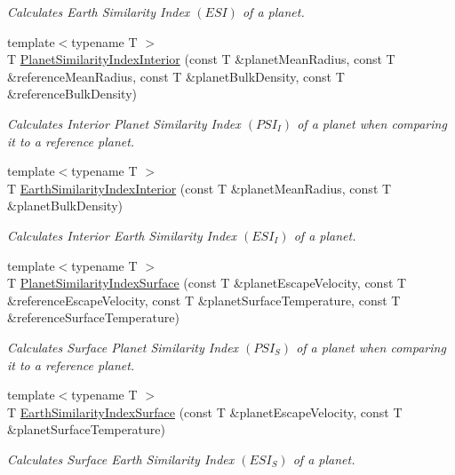 \begin{DoxyCompactItemize}
\begin{DoxyCompactList}\small\item\em Calculates Earth Similarity Index $(ESI)$ of a planet. \end{DoxyCompactList}\item 
{\footnotesize template$<$typename T $>$ }\\T \mbox{\hyperlink{group___e_g_x_phys-_planet_criteria_ga6dc06a1a8baf6e132abed51fcf410c7f}{Planet\+Similarity\+Index\+Interior}} (const T \&planet\+Mean\+Radius, const T \&reference\+Mean\+Radius, const T \&planet\+Bulk\+Density, const T \&reference\+Bulk\+Density)
\begin{DoxyCompactList}\small\item\em Calculates Interior Planet Similarity Index $(PSI_I)$ of a planet when comparing it to a reference planet. \end{DoxyCompactList}\item 
{\footnotesize template$<$typename T $>$ }\\T \mbox{\hyperlink{group___e_g_x_phys-_planet_criteria_ga699bcc2f17b8855eaa856595d8032f61}{Earth\+Similarity\+Index\+Interior}} (const T \&planet\+Mean\+Radius, const T \&planet\+Bulk\+Density)
\begin{DoxyCompactList}\small\item\em Calculates Interior Earth Similarity Index $(ESI_I)$ of a planet. \end{DoxyCompactList}\item 
{\footnotesize template$<$typename T $>$ }\\T \mbox{\hyperlink{group___e_g_x_phys-_planet_criteria_gae0c7dce2779d66b0560ca388a34ddc39}{Planet\+Similarity\+Index\+Surface}} (const T \&planet\+Escape\+Velocity, const T \&reference\+Escape\+Velocity, const T \&planet\+Surface\+Temperature, const T \&reference\+Surface\+Temperature)
\begin{DoxyCompactList}\small\item\em Calculates Surface Planet Similarity Index $(PSI_S)$ of a planet when comparing it to a reference planet. \end{DoxyCompactList}\item 
{\footnotesize template$<$typename T $>$ }\\T \mbox{\hyperlink{group___e_g_x_phys-_planet_criteria_ga1df772b0ed354ca7f7e4a7a4af072325}{Earth\+Similarity\+Index\+Surface}} (const T \&planet\+Escape\+Velocity, const T \&planet\+Surface\+Temperature)
\begin{DoxyCompactList}\small\item\em Calculates Surface Earth Similarity Index $(ESI_S)$ of a planet. \end{DoxyCompactList}\item 

\end{DoxyCompactItemize}
